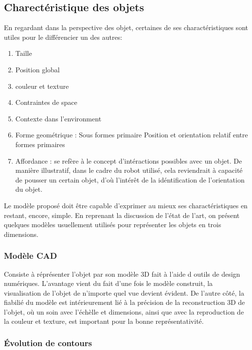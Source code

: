 {\subsection{Charectéristique des objets} 

En regardant dans la perspective des objet, certaines de ses charactéristiques sont utiles pour le différencier un des autres:

\begin {enumerate}
\item Taille
\item Position global
\item couleur et texture
\item Contraintes de space
\item Contexte dans l'environment
\item Forme geométrique : 
  \subitem Sous formes primaire 
  \subitem Position et orientation relatif entre formes primaires
\item Affordance : se refère à le concept d’intéractions possibles
  avec un objet. De manière illustratif, dans le cadre du robot utilisé,
  cela reviendrait à capacité de pousser un certain objet, d’où
  l’intérêt de la idéntification de l’orientation du objet.
\end{enumerate} 
}

Le modèle proposé doit être capable d'exprimer au
mieux ses charactéristiques en restant, encore, simple.  En reprenant la
discussion de l'état de l'art, on présent quelques modèles usuellement
utilisés pour représenter les objets en trois dimensions.

\subsubsection{Modèle CAD}

Consiste à réprésenter l'objet par son modèle 3D fait à l'aide d
outils de design numériques. L'avantage vient du fait d'une fois le
modèle construit, la visualisation de l'objet de n'importe quel vue
devient évident. De l'autre côté, la fiabilié du modèle est
intérieurement lié à la précision de la reconstruction 3D de l'objet,
où un soin avec l'échèlle et dimensions, ainsi que avec la
reproduction de la couleur et texture, est important pour la bonne
représentativité.

\subsubsection{Évolution de contours}

